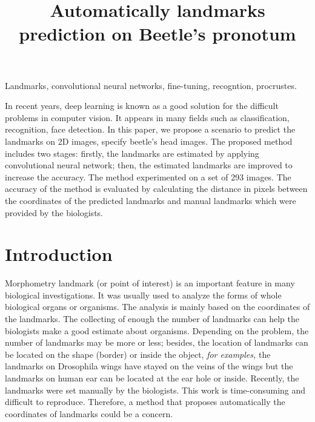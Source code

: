 \documentclass[10pt]{article}
\begin{document}
\noindent



\title{Automatically landmarks prediction on Beetle's pronotum}




\maketitle

\keywords
Landmarks, convolutional neural networks, fine-tuning, recogntion, procrustes.

\abstract
In recent years, deep learning is known as a good solution for the difficult problems in computer vision. It appears in many fields such as classification, recognition, face detection. In this paper, we propose a scenario to predict the landmarks on 2D images, specify beetle's head images. The proposed method includes two stages: firstly, the landmarks are estimated by applying convolutional neural network; then, the estimated landmarks are improved to increase the accuracy. The method experimented on a set of 293 images. The accuracy of the method is evaluated by calculating the distance in pixels between the coordinates of the predicted landmarks and manual landmarks which were provided by the biologists.

\section{Introduction}
Morphometry landmark (or point of interest) is an important feature in many biological investigations. It was usually used to analyze the forms of whole biological organs or organisms. The analysis is mainly based on the coordinates of the landmarks. The collecting of enough the number of landmarks can help the biologists make a good estimate about organisms. Depending on the problem, the number of landmarks may be more or less; besides, the location of landmarks can be located on the shape (border) or inside the object, \textit{for examples,} the landmarks on Drosophila wings have stayed on the veins of the wings but the landmarks on human ear can be located at the ear hole or inside. Recently, the landmarks were set manually by the biologists. This work is time-consuming and difficult to reproduce. Therefore, a method that proposes automatically the coordinates of landmarks could be a concern. 
\end{document}
